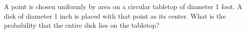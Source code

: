 A point is chosen uniformly by area on a circular tabletop of diameter 1 foot. A disk of diameter 1 inch is placed with that point as its center. What is the probability that the entire disk lies on the tabletop?
